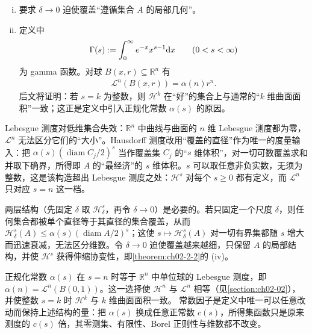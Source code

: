 \documentclass[../../main.tex]{subfiles}%
\begin{document}
\begin{remark}\label{remark:ch02-def-2-1-说明}
\begin{enumerate}[(i)]
\item 要求 $\delta\to0$ 迫使覆盖“遵循集合 $A$ 的局部几何”。
\item 定义中
\begin{align*}
\Gamma(s):=\int_0^{\infty}e^{-x}x^{s-1}\mathrm{d} x\qquad(0<s<\infty)
\end{align*}
为 gamma 函数。对球 $B(x,r)\subseteq\mathbb{R}^n$ 有
\begin{align*}
\mathcal{L}^n(B(x,r))=\alpha(n)r^n.
\end{align*}
后文将证明：若 $s=k$ 为整数，则 $\mathcal{H}^k$ 在“好”的集合上与通常的“$k$ 维曲面面积”一致；这正是定义中引入正规化常数 $\alpha(s)$ 的原因。
\end{enumerate}
\end{remark}

\begin{remark}\label{remark:ch02-def-2-1-动机}
Lebesgue 测度对低维集合失效：$\mathbb{R}^n$ 中曲线与曲面的 $n$ 维 Lebesgue 测度都为零，$\mathcal{L}^n$ 无法区分它们的“大小”。Hausdorff 测度改用“覆盖的直径”作为唯一的度量输入：把 $\alpha(s)(\operatorname{diam}C_j/2)^s$ 当作覆盖集 $C_j$ 的“$s$ 维体积”，对一切可数覆盖求和并取下确界，所得即 $A$ 的“最经济”的 $s$ 维体积。$s$ 可以取任意非负实数，无须为整数，这是该构造超出 Lebesgue 测度之处：$\mathcal{H}^s$ 对每个 $s\geqslant0$ 都有定义，而 $\mathcal{L}^n$ 只对应 $s=n$ 这一档。

两层结构（先固定 $\delta$ 取 $\mathcal{H}^s_\delta$，再令 $\delta\to0$）是必要的。若只固定一个尺度 $\delta$，则任何集合都被单个直径等于其直径的集合覆盖，从而 $\mathcal{H}^s_\delta(A)\leqslant\alpha(s)(\operatorname{diam}A/2)^s$；这使 $s\mapsto\mathcal{H}^s_\delta(A)$ 对一切有界集都随 $s$ 增大而迅速衰减，无法区分维数。令 $\delta\to0$ 迫使覆盖越来越细，只保留 $A$ 的局部结构，并使 $\mathcal{H}^s$ 获得伸缩协变性，即\cref{theorem:ch02-2-2}的 (iv)。%

正规化常数 $\alpha(s)$ 在 $s=n$ 时等于 $\mathbb{R}^n$ 中单位球的 Lebesgue 测度，即 $\alpha(n)=\mathcal{L}^n(B(0,1))$。这一选择使 $\mathcal{H}^n$ 与 $\mathcal{L}^n$ 相等（见\cref{section:ch02-02}），并使整数 $s=k$ 时 $\mathcal{H}^k$ 与 $k$ 维曲面面积一致。%
常数因子是定义中唯一可以任意改动而保持上述结构的量：把 $\alpha(s)$ 换成任意正常数 $c(s)$，所得集函数只是原来测度的 $c(s)$ 倍，其零测集、有限性、Borel 正则性与维数都不改变。
\end{remark}
\end{document}
